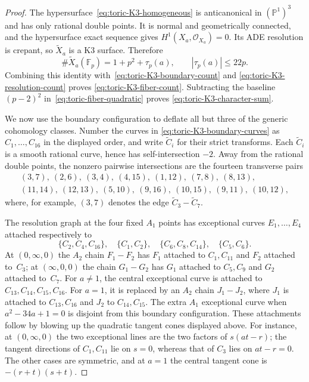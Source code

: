 \begin{proof}
The hypersurface~\eqref{eq:toric-K3-homogeneous} is anticanonical in
$(\mathbb P^1)^3$ and has only rational double points.  It is normal and
geometrically connected, and the hypersurface exact sequence gives
$H^1(X_a,\mathcal O_{X_a})=0$.  Its ADE resolution is crepant, so
$\widetilde X_a$ is a K3 surface.  Therefore
\[
 \#\widetilde X_a(\mathbb F_p)=1+p^2+\tau_p(a),
 \qquad |\tau_p(a)|\leq22p.
\]
Combining this identity with~\eqref{eq:toric-K3-boundary-count} and
\eqref{eq:toric-K3-resolution-count} proves
\eqref{eq:toric-K3-fiber-count}.  Subtracting the baseline
$(p-2)^2$ in~\eqref{eq:toric-fiber-quadratic} proves
\eqref{eq:toric-K3-character-sum}.

We now use the boundary configuration to deflate all but three of the
generic cohomology classes.  Number the curves in
\eqref{eq:toric-K3-boundary-curves} as $C_1,\ldots,C_{16}$ in the displayed
order, and write $\widetilde C_i$ for their strict transforms.  Each
$\widetilde C_i$ is a smooth rational curve, hence has self-intersection
$-2$.  Away from the rational double points, the nonzero pairwise
intersections are the fourteen transverse pairs
\begin{equation}
\begin{gathered}
 (3,7),\ (2,6),\ (3,4),\ (4,15),\ (1,12),\ (7,8),\ (8,13),\\
 (11,14),\ (12,13),\ (5,10),\ (9,16),\ (10,15),\ (9,11),\ (10,12),
\end{gathered}
\label{eq:toric-K3-smooth-intersection-edges}
\end{equation}
where, for example, $(3,7)$ denotes the edge
$\widetilde C_3\mathbin{-}\widetilde C_7$.

The resolution graph at the four fixed $A_1$ points has exceptional curves
$E_1,\ldots,E_4$ attached respectively to
\begin{equation}
 \{C_2,C_4,C_{16}\},\quad \{C_1,C_2\},\quad
 \{C_6,C_8,C_{14}\},\quad \{C_5,C_6\}.
 \label{eq:toric-K3-A1-attachments}
\end{equation}
At $(0,\infty,0)$ the $A_2$ chain $F_1-F_2$ has $F_1$ attached to
$C_1,C_{11}$ and $F_2$ attached to~$C_3$; at
$(\infty,0,0)$ the chain $G_1-G_2$ has $G_1$ attached to $C_5,C_9$ and
$G_2$ attached to~$C_7$.  For $a\ne1$, the central exceptional curve is
attached to $C_{13},C_{14},C_{15},C_{16}$.  For $a=1$, it is replaced by
an $A_2$ chain $J_1-J_2$, where $J_1$ is attached to $C_{13},C_{16}$ and
$J_2$ to $C_{14},C_{15}$.  The extra $A_1$ exceptional curve when
$a^2-34a+1=0$ is disjoint from this boundary configuration.  These
attachments follow by blowing up the quadratic tangent cones displayed
above.  For instance, at $(0,\infty,0)$ the two exceptional lines are the
two factors of $s(at-r)$; the tangent directions of $C_1,C_{11}$ lie on
$s=0$, whereas that of $C_3$ lies on $at-r=0$.  The other cases are
symmetric, and at $a=1$ the central tangent cone is
$-(r+t)(s+t)$.


\end{proof}
